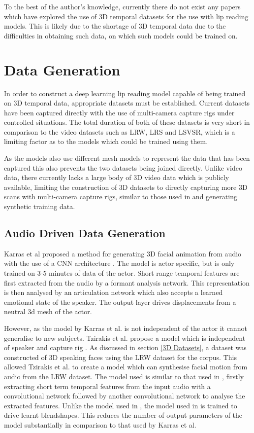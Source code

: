 \documentclass[12pt]{report}
\begin{document}
To the best of the author's knowledge, currently there do not exist any papers which have explored the use of 3D temporal datasets for the use with lip reading models. 
This is likely due to the shortage of 3D temporal data due to the difficulties in obtaining such data, on which such models could be trained on.

\section{Data Generation}
In order to construct a deep learning lip reading model capable of being trained on 3D temporal data, appropriate datasets must be established.
Current datasets have been captured directly \cite{Tzirakis2019, Cudeiro2019} with the use of multi-camera capture rigs under controlled situations.
The total duration of both of these datasets is very short in comparison to the video datasets such as LRW, LRS and LSVSR, which is a limiting factor as to the models which could be trained using them.

As the models also use different mesh models to represent the data that has been captured this also prevents the two datasets being joined directly.
Unlike video data, there currently lacks a large body of 3D video data which is publicly available, limiting the construction of 3D datasets to directly capturing more 3D scans with multi-camera capture rigs, similar to those used in \cite{Tzirakis2019, Cudeiro2019} and generating synthetic training data.

\subsection{Audio Driven Data Generation}
Karras et al proposed a method for generating 3D facial animation from audio with the use of a CNN architecture \cite{Karras2017a}.
The model is actor specific, but is only trained on 3-5 minutes of data of the actor.
Short range temporal features are first extracted from the audio by a formant analysis network.
This representation is then analysed by an articulation network which also accepts a learned emotional state of the speaker.
The output layer drives displacements from a neutral 3d mesh of the actor.

However, as the model by Karras et al. is not independent of the actor it cannot generalise to new subjects.
Tzirakis et al. propose a model which is independent of speaker and capture rig \cite{Tzirakis2019}.
As discussed in section \ref{3D Datasets}, a dataset was constructed of 3D speaking faces using the LRW dataset \cite{Chung2016} for the corpus.
This allowed Tzirakis et al. to create a model which can synthesise facial motion from audio from the LRW dataset.
The model used is similar to that used in \cite{Karras2017a}, firstly extracting short term temporal features from the input audio with a convolutional network followed by another convolutional network to analyse the extracted features.
Unlike the model used in \cite{Karras2017a}, the model used in \cite{Tzirakis2019} is trained to drive learnt blendshapes.
This reduces the number of output parameters of the model substantially in comparison to that used by Karras et al.
\end{document}

